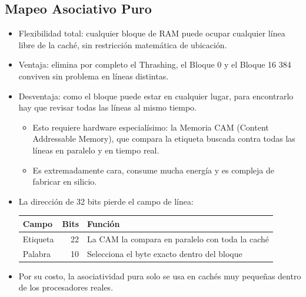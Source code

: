 \documentclass{article}
\begin{document}
\subsection{Mapeo Asociativo Puro}
\label{sec:org57ff85d}
\begin{itemize}
\item Flexibilidad total: cualquier bloque de RAM puede ocupar cualquier
línea libre de la caché, sin restricción matemática de ubicación.
\item \alert{Ventaja}: elimina por completo el Thrashing, el Bloque 0 y el
Bloque 16 384 conviven sin problema en líneas distintas.
\item \alert{Desventaja}: como el bloque puede estar en cualquier lugar, para
encontrarlo hay que revisar todas las líneas al mismo tiempo.
\begin{itemize}
\item Esto requiere hardware especialísimo: la \alert{Memoria CAM} (Content
Addressable Memory), que compara la etiqueta buscada contra todas
las líneas en paralelo y en tiempo real.
\item Es extremadamente cara, consume mucha energía y es compleja de
fabricar en silicio.
\end{itemize}
\item La dirección de 32 bits pierde el campo de línea:
\begin{center}
\begin{tabular}{lrl}
Campo & Bits & Función\\[0pt]
\hline
Etiqueta & 22 & La CAM la compara en paralelo con toda la caché\\[0pt]
Palabra & 10 & Selecciona el byte exacto dentro del bloque\\[0pt]
\end{tabular}
\end{center}
\item Por su costo, la asociatividad pura solo se usa en cachés muy
pequeñas dentro de los procesadores reales.
\end{itemize}
\end{document}
